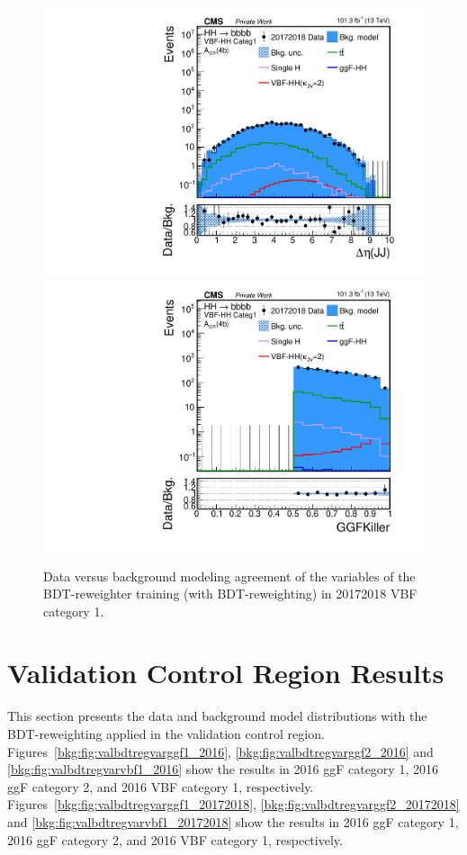 \begin{figure}[htbp!]
\begin{center}
\includegraphics[width=0.24\linewidth]{Figures/Modeling/background/plotsDatadrivenWithBDT/20172018/VBFcateg1_CR_110/Histogram/plot20172018_j1j2_deltaEta_Btag4_VBFcateg1_CR_110_Histogram_log.pdf}
\includegraphics[width=0.24\linewidth]{Figures/Modeling/background/plotsDatadrivenWithBDT/20172018/VBFcateg1_CR_110/Histogram/plot20172018_GGFKiller_Btag4_VBFcateg1_CR_110_Histogram_log.pdf}
\end{center}
\caption{Data versus background modeling agreement of the variables of the BDT-reweighter training (with BDT-reweighting) in 20172018 VBF category 1.}
\label{bkg:fig:bdtregvarvbf1_20172018}
\end{figure}

\clearpage

\section{Validation Control Region Results}

This section presents the data and background model distributions with the BDT-reweighting applied in the validation control region. Figures~\ref{bkg:fig:valbdtregvarggf1_2016}, \ref{bkg:fig:valbdtregvarggf2_2016} and \ref{bkg:fig:valbdtregvarvbf1_2016} show the results in 2016 ggF category 1, 2016 ggF category 2, and 2016 VBF category 1, respectively. Figures~\ref{bkg:fig:valbdtregvarggf1_20172018}, \ref{bkg:fig:valbdtregvarggf2_20172018} and \ref{bkg:fig:valbdtregvarvbf1_20172018} show the results in 2016 ggF category 1, 2016 ggF category 2, and 2016 VBF category 1, respectively.

